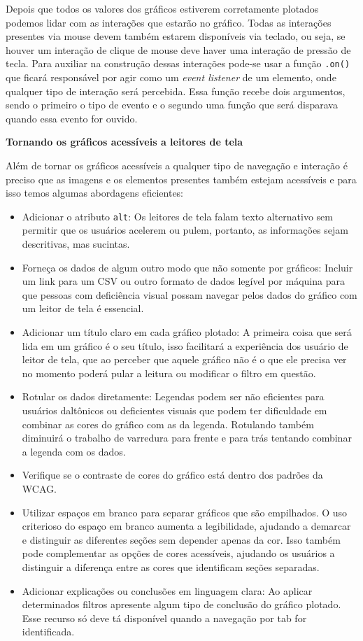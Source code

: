 {Depois que todos os valores dos gráficos estiverem corretamente plotados podemos lidar com as interações que estarão no gráfico. Todas as interações presentes via mouse devem também estarem disponíveis via teclado, ou seja, se houver um interação de clique de mouse deve haver uma interação de pressão de tecla. Para auxiliar na construção dessas interações pode-se usar a função \lstinline{.on()} que ficará responsável por agir como um \textit{event listener} de um elemento, onde qualquer tipo de interação será percebida. Essa função recebe dois argumentos, sendo o primeiro o tipo de evento e o segundo uma função que será disparava quando essa evento for ouvido. 


\textbf{Tornando os gráficos acessíveis a leitores de tela}

{Além de tornar os gráficos acessíveis a qualquer tipo de navegação e interação é preciso que as imagens e os elementos presentes também estejam acessíveis e para isso temos algumas abordagens eficientes:
\begin{itemize}
    \item Adicionar o atributo \lstinline{alt}: Os leitores de tela falam texto alternativo sem permitir que os usuários acelerem ou pulem, portanto, as informações sejam descritivas, mas sucintas.
    \item Forneça os dados de algum outro modo que não somente por gráficos: Incluir um link para um CSV ou outro formato de dados legível por máquina para que pessoas com deficiência visual possam navegar pelos dados do gráfico com um leitor de tela é essencial.
    \item Adicionar um título claro em cada gráfico plotado: A primeira coisa que será lida em um gráfico é o seu título, isso facilitará a experiência dos usuário de leitor de tela, que ao perceber que aquele gráfico não é o que ele precisa ver no momento poderá pular a leitura ou modificar o filtro em questão.
    \item Rotular os dados diretamente: Legendas podem ser não eficientes para usuários daltônicos ou deficientes visuais que podem ter dificuldade em combinar as cores do gráfico com as da legenda. Rotulando também diminuirá o trabalho de varredura para frente e para trás tentando combinar a legenda com os dados.
    \item Verifique se o contraste de cores do gráfico está dentro dos padrões da WCAG.
    \item Utilizar espaços em branco para separar gráficos que são empilhados. O uso criterioso do espaço em branco aumenta a legibilidade, ajudando a demarcar e distinguir as diferentes seções sem depender apenas da cor. Isso também pode complementar as opções de cores acessíveis, ajudando os usuários a distinguir a diferença entre as cores que identificam seções separadas.
    \item Adicionar explicações ou conclusões em linguagem clara: Ao aplicar determinados filtros apresente algum tipo de conclusão do gráfico plotado. Esse recurso só deve tá disponível quando a navegação por tab for identificada. 
\end{itemize}


}}
